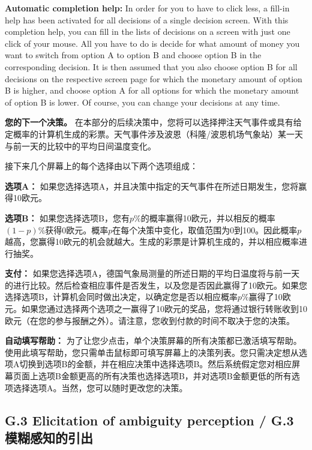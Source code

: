 \documentclass[12pt,a4paper]{article}
\newenvironment{original}
  {\par\medskip\noindent\color{black}\ignorespaces}
  {\par\medskip}
\newenvironment{translation}
  {\par\noindent\color{transblue}\ignorespaces}
  {\par\medskip\medskip}
\begin{document}
\begin{original}
\textbf{Automatic completion help:} In order for you to have to click less, a fill-in help has been activated for all decisions of a single decision screen. With this completion help, you can fill in the lists of decisions on a screen with just one click of your mouse. All you have to do is decide for what amount of money you want to switch from option A to option B and choose option B in the corresponding decision. It is then assumed that you also choose option B for all decisions on the respective screen page for which the monetary amount of option B is higher, and choose option A for all options for which the monetary amount of option B is lower. Of course, you can change your decisions at any time.
\end{original}

\begin{translation}
\textbf{您的下一个决策。} 在本部分的后续决策中，您将可以选择押注天气事件或具有给定概率的计算机生成的彩票。天气事件涉及波恩（科隆/波恩机场气象站）某一天与前一天的比较中的平均日间温度变化。

接下来几个屏幕上的每个选择由以下两个选项组成：

\textbf{选项A：} 如果您选择选项A，并且决策中指定的天气事件在所述日期发生，您将赢得10欧元。

\textbf{选项B：} 如果您选择选项B，您有$p\%$的概率赢得10欧元，并以相反的概率$(1-p)\%$获得0欧元。概率$p$在每个决策中变化，取值范围为0到100。因此概率$p$越高，您赢得10欧元的机会就越大。生成的彩票是计算机生成的，并以相应概率进行抽奖。

\textbf{支付：} 如果您选择选项A，德国气象局测量的所述日期的平均日温度将与前一天的进行比较。然后检查相应事件是否发生，以及您是否因此赢得了10欧元。如果您选择选项B，计算机会同时做出决定，以确定您是否以相应概率$p\%$赢得了10欧元。如果您通过选择两个选项之一赢得了10欧元的奖品，您将通过银行转账收到10欧元（在您的参与报酬之外）。请注意，您收到付款的时间不取决于您的决策。

\textbf{自动填写帮助：} 为了让您少点击，单个决策屏幕的所有决策都已激活填写帮助。使用此填写帮助，您只需单击鼠标即可填写屏幕上的决策列表。您只需决定想从选项A切换到选项B的金额，并在相应决策中选择选项B。然后系统假定您对相应屏幕页面上选项B金额更高的所有决策也选择选项B，并对选项B金额更低的所有选项选择选项A。当然，您可以随时更改您的决策。
\end{translation}

\subsection*{G.3 Elicitation of ambiguity perception / G.3 模糊感知的引出}
\end{document}
